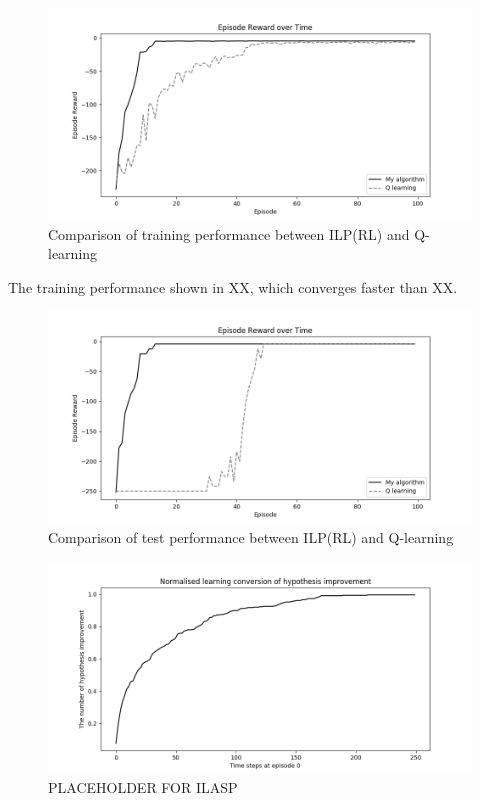\begin{figure}[!htb]
\centering
\includegraphics[width=1.0\textwidth]{./figures/experiment3_training}
\caption{Comparison of training performance between ILP(RL) and Q-learning}
\label{experiment3_training}
\end{figure}

The training performance shown in XX, which converges faster than XX. 

\begin{figure}[!htb]
\centering
\includegraphics[width=1.0\textwidth]{./figures/experiment3_test}
\caption{Comparison of test performance between ILP(RL) and Q-learning}
\label{experiment3_test}
\end{figure}

\begin{figure}[!htb]
\centering
\includegraphics[width=1.0\textwidth]{./figures/experiment1_ilasp}
\caption{PLACEHOLDER FOR ILASP}
\label{experiment1_test}
\end{figure}

